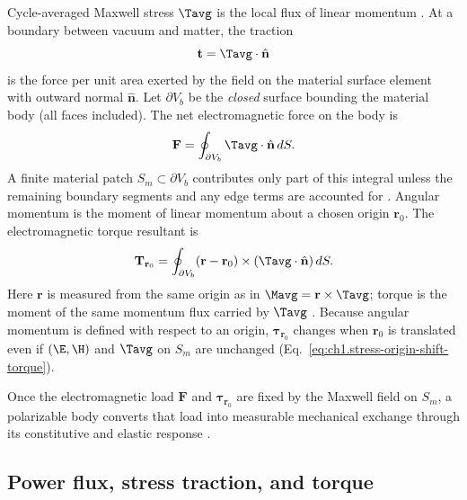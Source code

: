 \label{sec:ch01.5.1}

Cycle-averaged Maxwell stress $\Tavg$ is the local flux of linear momentum \cite{maxwell1873,stratton1941}. At a boundary between vacuum and matter, the traction
\begin{equation}
\label{eq:ch1.stress-traction-definition}
\mathbf{t}=\Tavg\cdot\hat{\mathbf{n}}
\end{equation}
is the force per unit area exerted by the field on the material surface element with outward normal $\hat{\mathbf{n}}$. Let $\partial V_b$ be the \emph{closed} surface bounding the material body (all faces included). The net electromagnetic force on the body is
\begin{equation}
\label{eq:ch1.stress-force-integral}
\mathbf{F}=\oint_{\partial V_b}\Tavg\cdot\hat{\mathbf{n}}\,dS.
\end{equation}
A finite material patch $S_m\subset\partial V_b$ contributes only part of this integral unless the remaining boundary segments and any edge terms are accounted for \cite{stratton1941}. Angular momentum is the moment of linear momentum about a chosen origin $\mathbf{r}_0$. The electromagnetic torque resultant is
\begin{equation}
\label{eq:ch1.stress-torque-integral}
\mathbf{T}_{\mathbf{r}_0}=\oint_{\partial V_b}(\mathbf{r}-\mathbf{r}_0)\times(\Tavg\cdot\hat{\mathbf{n}})\,dS.
\end{equation}
Here $\mathbf{r}$ is measured from the same origin as in $\Mavg=\mathbf{r}\times\Tavg$; torque is the moment of the same momentum flux carried by $\Tavg$ \cite{stratton1941,beth1936}. Because angular momentum is defined with respect to an origin, $\boldsymbol{\tau}_{\mathbf{r}_0}$ changes when $\mathbf{r}_0$ is translated even if $(\E,\H)$ and $\Tavg$ on $S_m$ are unchanged (Eq.~\eqref{eq:ch1.stress-origin-shift-torque}).

Once the electromagnetic load $\mathbf{F}$ and $\boldsymbol{\tau}_{\mathbf{r}_0}$ are fixed by the Maxwell field on $S_m$, a polarizable body converts that load into measurable mechanical exchange through its constitutive and elastic response \cite{beth1936,stratton1941}.

\subsection{Power flux, stress traction, and torque}
\label{sec:ch01.5.2}

